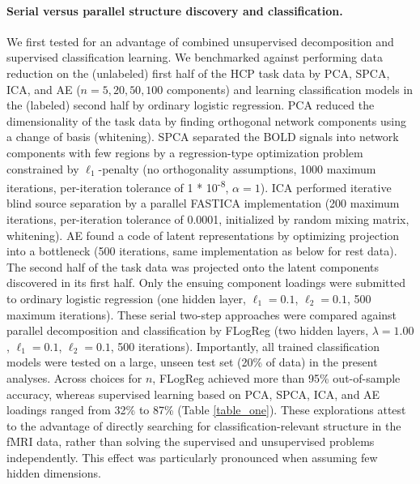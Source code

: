 \documentclass{article} %
\begin{document}
\paragraph{Serial versus parallel structure discovery and classification.}
We first tested for an advantage of combined unsupervised decomposition
and supervised classification learning.
We benchmarked against
performing data reduction on the (unlabeled)
first half of the HCP task data by PCA, SPCA, ICA, and
AE ($n=5, 20, 50, 100$ components)
and learning classification models in the (labeled) second half
by ordinary logistic regression.
%
PCA reduced the dimensionality of the task data by
finding orthogonal network components using a change of basis
(whitening).
%
SPCA separated the BOLD signals into
network components with few regions by
a regression-type optimization problem constrained by
$\ell_1$-penalty
(no orthogonality assumptions, 1000 maximum iterations,
per-iteration tolerance of 1 * 10\textsuperscript{-8},
$\alpha=1$).
%
ICA performed iterative blind source separation
by a parallel FASTICA implementation (200 maximum iterations,
per-iteration tolerance of 0.0001,
initialized by random mixing matrix, whitening).
%
AE found a code of latent representations by optimizing projection
into a bottleneck
(500 iterations, same implementation as below for rest data).
%
The second half of the task data was projected onto the
latent components discovered in its first half.
Only the ensuing component loadings were submitted to ordinary
logistic regression
(one hidden layer, $\ell_1=0.1$, $\ell_2=0.1$, 500 maximum iterations).
%
These serial two-step approaches were
compared against parallel decomposition and classification by FLogReg
(two hidden layers, $\lambda=1.00$, $\ell_1=0.1$, $\ell_2=0.1$,
500 iterations).
Importantly, all trained classification models were tested
on a large, unseen test set (20\% of data) in the present analyses.
%
Across choices for $n$, FLogReg
achieved more than 95\% out-of-sample accuracy, whereas
supervised learning based on PCA, SPCA, ICA, and AE loadings
ranged from 32\% to 87\%
(Table \ref{table_one}).
%
These explorations attest to the advantage of directly searching for
classification-relevant structure in the fMRI data,
rather than solving the supervised and unsupervised problems independently.
This effect was particularly pronounced when assuming few hidden dimensions.
\end{document}
